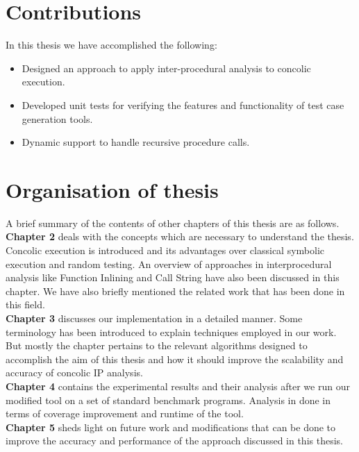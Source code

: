 \documentclass[12pt,oneside]{book}
\begin{document}

\section {Contributions}
In this thesis we have accomplished the following:
\begin{itemize}
\setlength\itemsep{0em}
  \item Designed an approach to apply inter-procedural analysis to concolic execution. 
  \item Developed unit tests for verifying the features and functionality of test case generation tools. 
  \item Dynamic support to handle recursive procedure calls. 
\end{itemize}


\section {Organisation of thesis}
A brief summary of the contents of other chapters of this thesis are as follows.\\

\textbf{Chapter 2} deals with the concepts which are necessary to understand the thesis. Concolic execution is introduced and its advantages over classical symbolic execution and random testing. An overview of approaches in interprocedural analysis like Function Inlining and Call String have also been discussed in this chapter. We have also briefly mentioned the related work that has been done in this field. \\

\textbf{Chapter 3} discusses our implementation in a detailed manner. Some terminology has been introduced to explain techniques employed in our work. But mostly the chapter pertains to the relevant algorithms designed to accomplish the aim of this thesis and how it should improve the scalability and accuracy of concolic IP analysis.\\

\textbf{Chapter 4} contains the experimental results and their analysis after we run our modified tool on a set of standard benchmark programs. Analysis in done in terms of coverage improvement and runtime of the tool.\\

\textbf{Chapter 5} sheds light on future work and modifications that can be done to improve the accuracy and performance of the approach discussed in this thesis.
\end{document}
